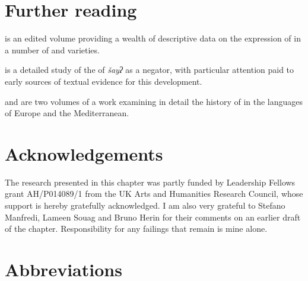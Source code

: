 \documentclass[output=paper]{langsci/langscibook}
\begin{document}
\section*{Further reading}\largerpage
\begin{furtherreading}
\item \citet{ChakerCaubet1996} is an edited volume providing a wealth of descriptive data on the expression of  in a number of  and   varieties.
\item \citet{Diem2014} is a detailed study of the  of  \textit{šayʔ} as a negator, with particular attention paid to early sources of textual evidence for this development.
\item \citet{WillisBreitbarth2013} and \citet{BreitbarthWillisLucasinpress} are two volumes of a work examining in detail the history of  in the languages of Europe and the Mediterranean.
\end{furtherreading}

\section*{Acknowledgements}

The research presented in this chapter was partly funded by Leadership Fellows grant AH/P014089/1 from the UK Arts and Humanities Research Council, whose support is hereby gratefully acknowledged. I am also very grateful to Stefano Manfredi, Lameen Souag and Bruno Herin for their comments on an earlier draft of the chapter. Responsibility for any failings that remain is mine alone.

\section*{Abbreviations}
\end{document}
